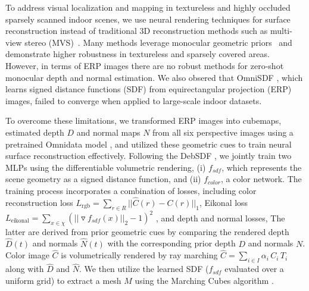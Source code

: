 To address visual localization and mapping in textureless and highly occluded sparsely scanned indoor scenes, we use neural rendering techniques \cite{yu2022monosdf, xiao2024debsdf} for surface reconstruction instead of traditional 3D reconstruction methods such as multi-view stereo (MVS)~\cite{schonberger2016pixelwise}.
Many methods leverage monocular geometric priors~\cite{yu2022monosdf, xiao2024debsdf} and demonstrate higher robustness in textureless and sparsely covered areas. However, 
in terms of ERP images there are no  robust methods for zero-shot monocular depth and normal estimation.
We also obsered  that OmniSDF \cite{kim2024omnisdf}, which learns signed distance functions (SDF) from equirectangular projection (ERP) images, failed to converge when applied to large-scale indoor datasets. 

To overcome these limitations, we transformed ERP images into cubemaps, estimated depth $D$ and normal maps $N$ from all six perspective images using a pretrained Omnidata model \cite{eftekhar2021omnidata}, and utilized these geometric cues to train neural surface reconstruction effectively.
Following the DebSDF \cite{xiao2024debsdf}, we jointly train two MLPs using the differentiable volumetric rendering, (i) $f_{sdf}$, which represents the scene geometry as a signed distance function, and (ii) $f_{color}$, a color network. 
The training process \cite{xiao2024debsdf} incorporates a combination of losses, including color reconstruction loss $L_{\text{rgb}} = \sum_{r \in R}||\hat{C}(r) - C(r)||_{1}$, Eikonal loss \cite{eikonal} $L_{\text{eikonal}} = \sum_{x \in \chi}(||\triangledown f_{sdf}(x)||_{2} - 1)^2$ , and depth and normal losses,
%
%
The latter are derived from prior geometric cues by comparing the rendered depth $\hat{D}(t)$ and normals $\hat{N}(t)$ with the corresponding prior depth $D$ and normals $N$. Color image $\hat{C}$ is volumetrically rendered by ray marching $\hat{C} = \sum_{i \in I} \alpha_i \, C_i \, T_i$ along with $\hat{D}$ and $\hat{N}$. We then utilize the learned SDF ($f_{sdf}$ evaluated over a uniform grid) to extract a mesh $M$ using the Marching Cubes algorithm \cite{marchingcube}.

